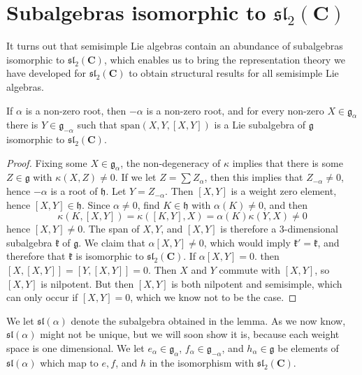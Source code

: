 \section{Subalgebras isomorphic to $\mathfrak{sl}_2(\mathbf{C})$}

It turns out that semisimple Lie algebras contain an abundance of subalgebras isomorphic to $\mathfrak{sl}_2(\mathbf{C})$, which enables us to bring the representation theory we have developed for $\mathfrak{sl}_2(\mathbf{C})$ to obtain structural results for all semisimple Lie algebras.

\begin{lemma}
    If $\alpha$ is a non-zero root, then $-\alpha$ is a non-zero root, and for every non-zero $X \in \mathfrak{g}_\alpha$ there is $Y \in \mathfrak{g}_{-\alpha}$ such that $\text{span}(X,Y,[X,Y])$ is a Lie subalgebra of $\mathfrak{g}$ isomorphic to $\mathfrak{sl}_2(\mathbf{C})$.
\end{lemma}
\begin{proof}
    Fixing some $X \in \mathfrak{g}_\alpha$, the non-degeneracy of $\kappa$ implies that there is some $Z \in \mathfrak{g}$ with $\kappa(X,Z) \neq 0$. If we let $Z = \sum Z_\alpha$, then this implies that $Z_{-\alpha} \neq 0$, hence $-\alpha$ is a root of $\mathfrak{h}$. Let $Y = Z_{-\alpha}$. Then $[X,Y]$ is a weight zero element, hence $[X,Y] \in \mathfrak{h}$. Since $\alpha \neq 0$, find $K \in \mathfrak{h}$ with $\alpha(K) \neq 0$, and then
    \[ \kappa(K,[X,Y]) = \kappa([K,Y],X) = \alpha(K) \kappa(Y,X) \neq 0 \]
    hence $[X,Y] \neq 0$. The span of $X, Y$, and $[X,Y]$ is therefore a 3-dimensional subalgebra $\mathfrak{k}$ of $\mathfrak{g}$. We claim that $\alpha [X,Y] \neq 0$, which would imply $\mathfrak{k}' = \mathfrak{k}$, and therefore that $\mathfrak{k}$ is isomorphic to $\mathfrak{sl}_2(\mathbf{C})$. If $\alpha [X,Y] = 0$. then $[X,[X,Y]] = [Y,[X,Y]] = 0$. Then $X$ and $Y$ commute with $[X,Y]$, so $[X,Y]$ is nilpotent. But then $[X,Y]$ is both nilpotent and semisimple, which can only occur if $[X,Y] = 0$, which we know not to be the case.
\end{proof}

We let $\mathfrak{sl}(\alpha)$ denote the subalgebra obtained in the lemma. As we now know, $\mathfrak{sl}(\alpha)$ might not be unique, but we will soon show it is, because each weight space is one dimensional. We let $e_\alpha \in \mathfrak{g}_\alpha$, $f_\alpha \in \mathfrak{g}_{-\alpha}$, and $h_\alpha \in \mathfrak{g}$ be elements of $\mathfrak{sl}(\alpha)$ which map to $e,f$, and $h$ in the isomorphism with $\mathfrak{sl}_2(\mathbf{C})$.

